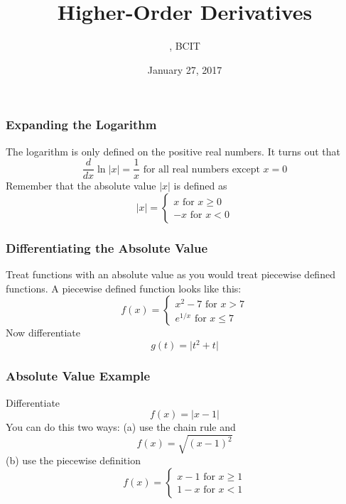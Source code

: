 \documentclass[xcolor=dvipsnames]{beamer}
\title{Higher-Order Derivatives}
\subtitle{{\CourseNumber}, BCIT}
\author{\CourseName}
\date{January 27, 2017}
\begin{document}
\begin{frame}
  \titlepage
\end{frame}

\begin{frame}
  \frametitle{Expanding the Logarithm}
The logarithm is only defined on the positive real numbers. It turns
out that
\begin{equation}
  \label{eq:feegeigu}
  \frac{d}{dx}\ln\vert{}x\vert=\frac{1}{x}\mbox{ for all real numbers except }x=0
\end{equation}
Remember that the absolute value $\vert{}x\vert$ is defined as
\begin{equation}
  \label{eq:iegeecie}
  \vert{}x\vert=\left\{
    \begin{array}{l}
      x\mbox{ for }x\geq{}0 \\
      -x\mbox{ for }x<0
    \end{array}\right.
\end{equation}
\end{frame}

\begin{frame}
  \frametitle{Differentiating the Absolute Value}
Treat functions with an absolute value as you would treat piecewise
defined functions. A piecewise defined function looks like this:
\begin{equation}
  \label{eq:iboashaz}
  f(x)=\left\{
    \begin{array}{l}
      x^{2}-7\mbox{ for }x>7 \\
      e^{1/x}\mbox{ for }x\leq{}7
    \end{array}\right.
\end{equation}
Now differentiate
\begin{equation}
  \label{eq:aeghooki}
  g(t)=\vert{}t^{2}+t\vert
\end{equation}
\end{frame}

\begin{frame}
  \frametitle{Absolute Value Example}
Differentiate
\begin{equation}
  \label{eq:eimufosh}
  f(x)=\vert{}x-1\vert
\end{equation}
You can do this two ways: (a) use the chain rule and
\begin{equation}
  \label{eq:agabooto}
f(x)=\sqrt{(x-1)^{2}}
\end{equation}
(b) use the piecewise definition
\begin{equation}
  \label{eq:ephohnge}
f(x)=\left\{
  \begin{array}{l}
    x-1\mbox{ for }x\geq{}1 \\
    1-x\mbox{ for }x<1
  \end{array}\right.
\end{equation}
\end{frame}
\end{document}
